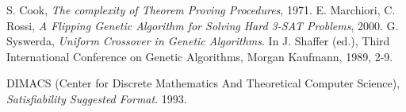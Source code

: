 \documentclass{article}
\theoremstyle{definition}
\begin{document}
\newpage
\begin{thebibliography}{}
 S. Cook, \textit{The complexity of Theorem Proving Procedures}, 1971.
 E. Marchiori, C. Rossi, \textit{A Flipping Genetic Algorithm for Solving Hard 3-SAT Problems}, 2000.
 G. Syswerda, \textit{Uniform Crossover in Genetic Algorithms}. In J. Shaffer (ed.), Third International Conference on Genetic Algorithms, Morgan Kaufmann, 1989, 2-9.

 DIMACS (Center for Discrete Mathematics And Theoretical Computer Science), \textit{Satisfiability Suggested Format}. 1993.
\end{thebibliography}
\end{document}
